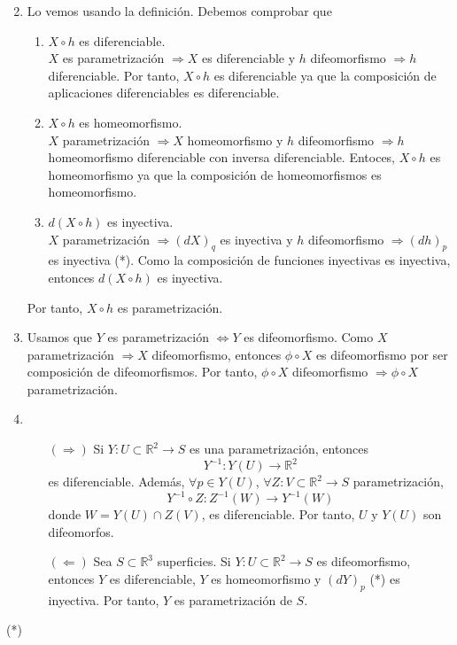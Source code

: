 \begin{sol}
  \begin{enumerate}
    \item [] 
    \item Lo vemos usando la definición. Debemos comprobar que 
      \begin{enumerate}
        \item $X \circ h$ es diferenciable. \\

          $X$ es parametrización $\Rightarrow X$ es diferenciable y $h$ difeomorfismo $\Rightarrow h$ diferenciable. Por tanto, $X \circ h$ es diferenciable ya que la composición de aplicaciones diferenciables es diferenciable.
        \item $X \circ h$ es homeomorfismo. \\

          $X$ parametrización $\Rightarrow X$ homeomorfismo y $h$ difeomorfismo $\Rightarrow h$ homeomorfismo diferenciable con inversa diferenciable. Entoces, $X \circ h$ es homeomorfismo ya que la composición de homeomorfismos es homeomorfismo.
        \item $ d(X \circ h)$ es inyectiva. \\

          $X$ parametrización $ \Rightarrow (d X)_{q}$ es inyectiva y $h$ difeomorfismo $\Rightarrow (d h)_{p}$ es inyectiva (*). Como la composición de funciones inyectivas es inyectiva, entonces $d(X \circ h)$ es inyectiva.


      \end{enumerate}
      Por tanto, $X \circ h$ es parametrización.
    \item Usamos que $Y$ es parametrización $\Leftrightarrow Y$ es difeomorfismo. Como $X$ parametrización $\Rightarrow X$ difeomorfismo, entonces $\phi \circ X$ es difeomorfismo por ser composición de difeomorfismos. Por tanto, $\phi \circ X$ difeomorfismo $\Rightarrow \phi \circ X$ parametrización.
    \item 
      \begin{enumerate}[label=(\roman*)]
        \item [$(\Rightarrow)$] Si $Y : U \subset \mathbb{R}^{2} \to S$ es una parametrización, entonces
          \[ 
            Y^{-1} : Y(U) \to \mathbb{R}^{2}
          \] 
          es diferenciable. Además, $\forall p \in Y(U)$, $\forall Z : V \subset \mathbb{R}^{2} \to S$ parametrización,
          \[ 
            Y^{-1} \circ Z : Z^{-1}(W) \to Y^{-1}(W)
          \] 
          donde $W = Y(U) \cap Z(V)$, es diferenciable. Por tanto, $U$ y $Y(U)$ son difeomorfos.
        \item [$(\Leftarrow)$] Sea $S \subset \mathbb{R}^{3}$ superficies. Si $Y : U \subset \mathbb{R}^{2} \to S$ es difeomorfismo, entonces $Y$ es diferenciable, $Y$ es homeomorfismo y $(d Y)_{p}$ (*) es inyectiva. Por tanto, $Y$ es parametrización de $S$. \\
      \end{enumerate}
  \end{enumerate}

  (*)
\end{sol}

